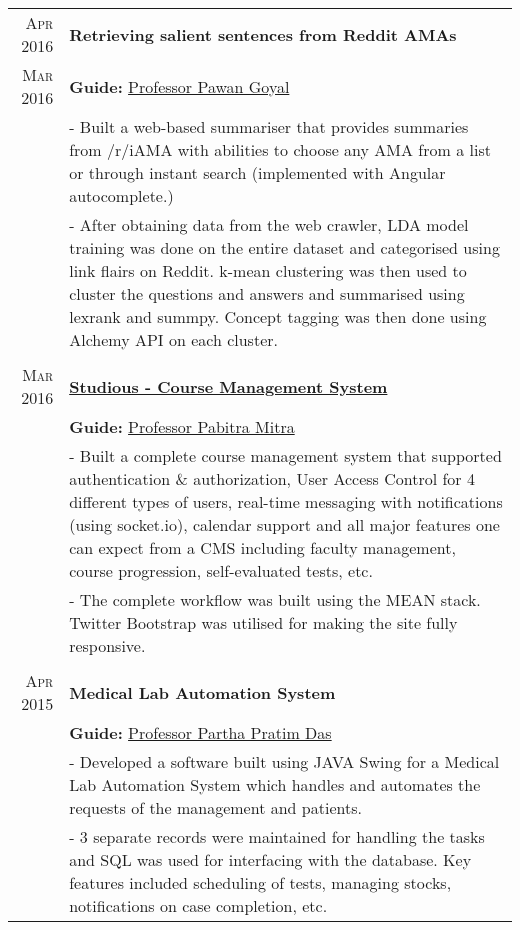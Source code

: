 \documentclass[a4paper,10pt]{extarticle} %
\begin{document}
\begin{tabular}{r|p{16cm}}

\textsc{Apr 2016} & \textbf{Retrieving salient sentences from Reddit AMAs} \\
\textsc{Mar 2016} & \textbf{Guide: }\textmd{\href{http://cse.iitkgp.ac.in/~pawang/}{Professor Pawan Goyal}}\\
& \footnotesize{- Built a web-based summariser that provides summaries from /r/iAMA with abilities to choose any AMA from a list or through instant search (implemented with Angular autocomplete.)}\\
& \footnotesize{- After obtaining data from the web crawler, LDA model training was done on the entire dataset and categorised using link flairs on Reddit. k-mean clustering was then used to cluster the questions and answers and summarised using lexrank and summpy. Concept tagging was then done using Alchemy API on each cluster.}\\
\multicolumn{2}{c}{} \\

\textsc{Mar 2016} & \textbf{\href{http://ghostwriternr.me/dbmsass3/}{Studious - Course Management System}}\\
& \textbf{Guide: }\textmd{\href{http://cse.iitkgp.ac.in/~pabitra/}{Professor Pabitra Mitra}}\\
& \footnotesize{- Built a complete course management system that supported authentication \& authorization, User Access Control for 4 different types of users, real-time messaging with notifications (using socket.io), calendar support and all major features one can expect from a CMS including faculty management, course progression, self-evaluated tests, etc.}\\
& \footnotesize{- The complete workflow was built using the MEAN stack. Twitter Bootstrap was utilised for making the site fully responsive.}\\
\multicolumn{2}{c}{} \\

\textsc{Apr 2015} & \textbf{Medical Lab Automation System}\\
& \textbf{Guide: }\textmd{\href{http://www.iitkgp.ac.in/fac-profiles/showprofile.php?empcode=SSmUZ}{Professor Partha Pratim Das}}\\
& \footnotesize{- Developed a software built using JAVA Swing for a Medical Lab Automation System which handles and automates the requests of the management and patients.}\\
& \footnotesize{- 3 separate records were maintained for handling the tasks and SQL was used for interfacing with the database. Key features included scheduling of tests, managing stocks, notifications on case completion, etc.}\\

\end{tabular}
\end{document}
